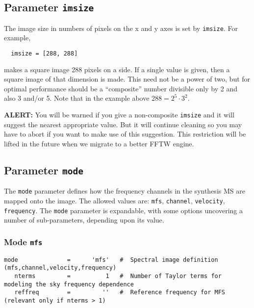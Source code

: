 \subsection{Parameter {\tt imsize} }
\label{section:im.pars.imsize}

The image size in numbers of pixels on the x and y axes is
set by {\tt imsize}.  For example,
\small
\begin{verbatim}
  imsize = [288, 288]
\end{verbatim}
\normalsize
makes a square image 288 pixels on a side.  If a single value
is given, then a square image of that dimension is made.  This
need not be a power of two, but for optimal performance should
be a ``composite'' number divisible only by 2 and also 3 and/or
5.  Note that in the example above $288 = 2^5 \cdot 3^2$.

{\bf ALERT:} You will be warned if you give a non-composite
{\tt imsize} and it will suggest the nearest appropriate value.
But it will continue cleaning so you may have to abort if you want
to make use of this suggestion.  This restriction will be lifted
in the future when we migrate to a better FFTW engine.

\subsection{Parameter {\tt mode} }
\label{section:im.pars.mode}

The {\tt mode} parameter defines how the frequency channels in the
synthesis MS are mapped onto the image.  The allowed values are:
{\tt mfs}, {\tt channel}, {\tt velocity}, {\tt frequency}.
The {\tt mode} parameter
is expandable, with some options uncovering a number of
sub-parameters, depending upon its value.

\subsubsection{Mode {\tt mfs} }
\label{section:im.pars.mode.mfs}

\begin{verbatim}
mode              =      'mfs'   #  Spectral image definition (mfs,channel,velocity,frequency)
   nterms         =          1   #  Number of Taylor terms for modeling the sky frequency dependence
   reffreq        =         ''   #  Reference frequency for MFS (relevant only if nterms > 1)
\end{verbatim}
\normalsize

